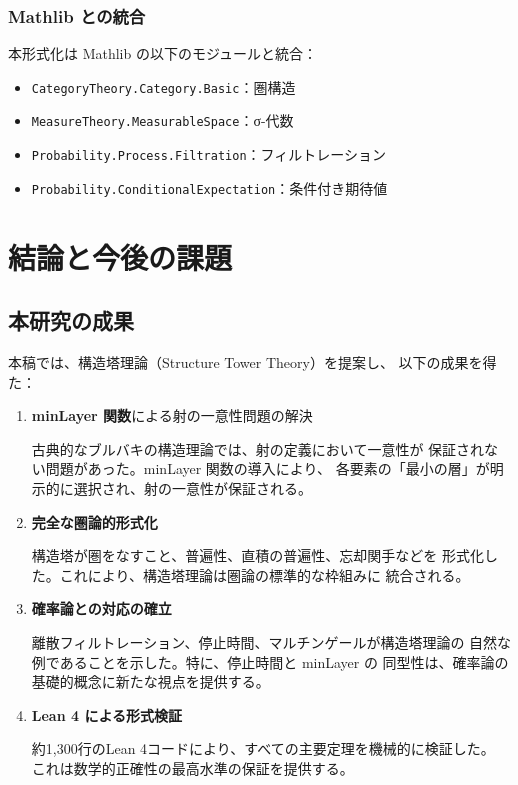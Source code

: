 \documentclass[11pt,a4paper]{article}
\theoremstyle{plain}
\theoremstyle{definition}
\begin{document}
\subsubsection{Mathlib との統合}

本形式化は Mathlib の以下のモジュールと統合：
\begin{itemize}
  \item \texttt{CategoryTheory.Category.Basic}：圏構造
  \item \texttt{MeasureTheory.MeasurableSpace}：σ-代数
  \item \texttt{Probability.Process.Filtration}：フィルトレーション
  \item \texttt{Probability.ConditionalExpectation}：条件付き期待値
\end{itemize}

\section{結論と今後の課題}
\label{sec:conclusion}

\subsection{本研究の成果}

本稿では、構造塔理論（Structure Tower Theory）を提案し、
以下の成果を得た：

\begin{enumerate}[label=\textbf{(\arabic*)}]
  \item \textbf{minLayer 関数}による射の一意性問題の解決
  
  古典的なブルバキの構造理論では、射の定義において一意性が
  保証されない問題があった。minLayer 関数の導入により、
  各要素の「最小の層」が明示的に選択され、射の一意性が保証される。
  
  \item \textbf{完全な圏論的形式化}
  
  構造塔が圏をなすこと、普遍性、直積の普遍性、忘却関手などを
  形式化した。これにより、構造塔理論は圏論の標準的な枠組みに
  統合される。
  
  \item \textbf{確率論との対応の確立}
  
  離散フィルトレーション、停止時間、マルチンゲールが構造塔理論の
  自然な例であることを示した。特に、停止時間と minLayer の
  同型性は、確率論の基礎的概念に新たな視点を提供する。
  
  \item \textbf{Lean 4 による形式検証}
  
  約1,300行のLean 4コードにより、すべての主要定理を機械的に検証した。
  これは数学的正確性の最高水準の保証を提供する。
\end{enumerate}
\end{document}

